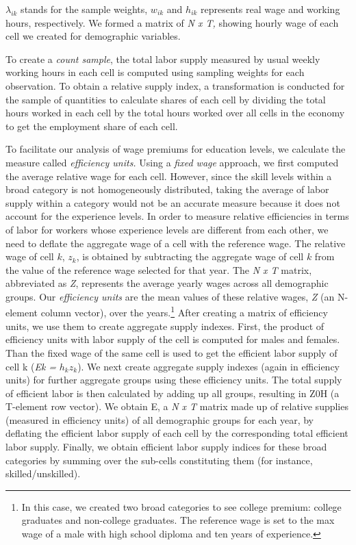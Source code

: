 \begin{onehalfspace}
\emph{$\lambda_{ik}$} stands for the sample weights, $w_{ik}$ and
$h_{ik}$ represents real wage and working hours, respectively. We
formed a matrix of \emph{N x T, }showing hourly wage of each cell
we created for demographic variables.

To create a \emph{count sample}, the total labor supply measured by
usual weekly working hours in each cell is computed using sampling
weights for each observation. To obtain a relative supply index, a
transformation is conducted for the sample of quantities to calculate
shares of each cell by dividing the total hours worked in each cell
by the total hours worked over all cells in the economy to get the
employment share of each cell.

To facilitate our analysis of wage premiums for education levels,
we calculate the measure called \emph{efficiency units. }Using a \emph{fixed
wage }approach, we first computed the average relative wage for each
cell. However, since the skill levels within a broad category is not
homogeneously distributed, taking the average of labor supply within
a category would not be an accurate measure because it does not account
for the experience levels. In order to measure relative efficiencies
in terms of labor for workers whose experience levels are different
from each other, we need to deflate the aggregate wage of a cell with
the reference wage. The relative wage of cell $k$, $z_{k}$, is obtained
by subtracting the aggregate wage of cell $k$ from the value of the
reference wage selected for that year. The \emph{N x T} matrix, abbreviated
as \emph{Z}, represents the average yearly wages across all demographic
groups. Our \emph{efficiency units} are the mean values of these relative
wages, \emph{Z} (an N-element column vector), over the years.\footnote{In this case, we created two broad categories to see college premium:
college graduates and non-college graduates. The reference wage is
set to the max wage of a male with high school diploma and ten years
of experience.} After creating a matrix of\emph{ }efficiency units, we use them to
create aggregate supply indexes. First, the product of efficiency
units with labor supply of the cell is computed for males and females.
Than the fixed wage of the same cell is used to get the efficient
labor supply of cell k (\emph{Ek = }$h_kz_k$). We next create aggregate
supply indexes (again in efficiency units) for further aggregate groups
using these efficiency units. The total supply of efficient labor
is then calculated by adding up all groups, resulting in Z0H (a T-element
row vector). We obtain E, a \emph{N x T} matrix made up of relative
supplies (measured in efficiency units) of all demographic groups
for each year, by deflating the efficient labor supply of each cell
by the corresponding total efficient labor supply. Finally, we obtain
efficient labor supply indices for these broad categories by summing
over the sub-cells constituting them (for instance, skilled/unskilled).
\citep{2008Autor}


\end{onehalfspace}
